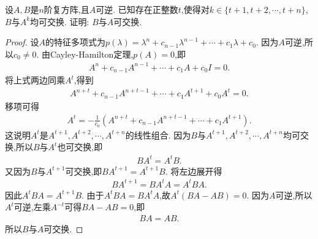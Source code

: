 \documentclass[../../main.tex]{subfiles}%
\begin{document}
\begin{example}
设\(A,B\)是\(n\)阶复方阵,且\(A\)可逆. 已知存在正整数\(t\),使得对\(k \in \{t+1, t+2, \cdots, t+n\}\),\(B\)与\(A^k\)均可交换. 证明: \(B\)与\(A\)可交换.
\end{example}
\begin{proof}
设\(A\)的特征多项式为\(p(\lambda) = \lambda^n + c_{n-1}\lambda^{n-1} + \cdots + c_1\lambda + c_0\). 因为\(A\)可逆,所以\(c_0 \neq 0\). 由Cayley-Hamilton定理,\(p(A) = 0\),即
\begin{align*}
A^n + c_{n-1}A^{n-1} + \cdots + c_1A + c_0I = 0.
\end{align*}
将上式两边同乘\(A^t\),得到
\begin{align*}
A^{n+t} + c_{n-1}A^{n+t-1} + \cdots + c_1A^{t+1} + c_0A^t = 0.
\end{align*}
移项可得
\begin{align*}
A^t = -\frac{1}{c_0}(A^{n+t} + c_{n-1}A^{n+t-1} + \cdots + c_1A^{t+1}).
\end{align*}
这说明\(A^t\)是\(A^{t+1}, A^{t+2}, \cdots, A^{t+n}\)的线性组合. 因为\(B\)与\(A^{t+1}, A^{t+2}, \cdots, A^{t+n}\)均可交换,所以\(B\)与\(A^t\)也可交换,即
\begin{align*}
BA^t = A^tB.
\end{align*}
又因为\(B\)与\(A^{t+1}\)可交换,即\(BA^{t+1} = A^{t+1}B\). 将左边展开得
\begin{align*}
BA^{t+1} = BA^tA = A^tBA.
\end{align*}
因此\(A^tBA = A^{t+1}B\). 由于\(A^tBA = BA^tA\),故\(A^t(BA - AB) = 0\). 因为\(A\)可逆,所以\(A^t\)可逆,左乘\(A^{-t}\)可得\(BA - AB = 0\),即
\begin{align*}
BA = AB.
\end{align*}
所以\(B\)与\(A\)可交换.
\end{proof}
\end{document}
